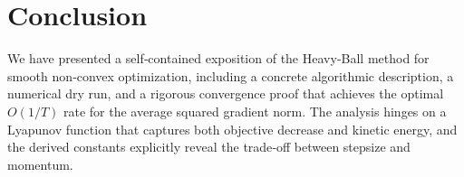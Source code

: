 \documentclass[11pt]{article}
\begin{document}
\section*{Conclusion}
We have presented a self‑contained exposition of the Heavy‑Ball method for
smooth non‑convex optimization, including a concrete algorithmic description,
a numerical dry run, and a rigorous convergence proof that achieves the optimal
$O(1/T)$ rate for the average squared gradient norm.  The analysis hinges on a
Lyapunov function that captures both objective decrease and kinetic energy,
and the derived constants explicitly reveal the trade‑off between stepsize
and momentum.
\end{document}
